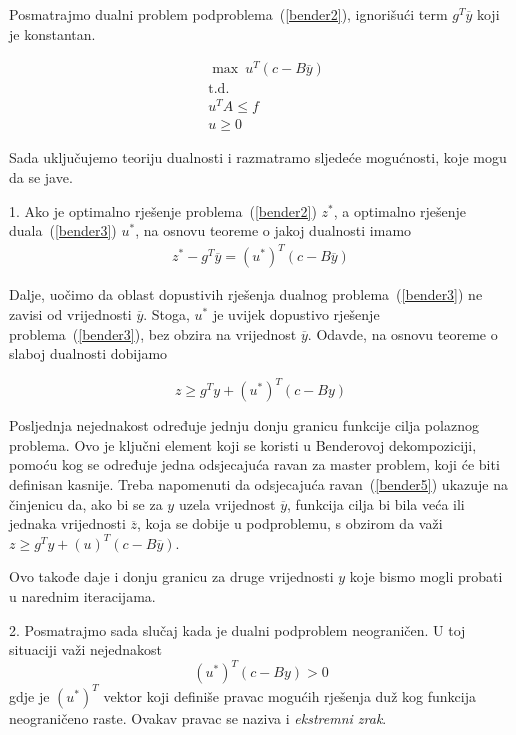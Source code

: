 \documentclass[a4paper, utf8, 11pt, colorlinks]{book}
\theoremstyle{definition}
\begin{document}
 
Posmatrajmo dualni problem podproblema~(\ref{bender2}), ignorišući term $g^T\overline{y}$ koji je konstantan.

\begin{equation}
	\begin{aligned}\label{bender3}
	&\max\ u^T (c-B\overline{y})\\
 		& \mbox{t.d.}\\
	&u^TA\leqslant f\\
	&u\geqslant 0
 \end{aligned}
\end{equation}


Sada uključujemo teoriju dualnosti i razmatramo sljedeće mogućnosti, koje mogu da se jave.
 
1. Ako je optimalno rješenje problema~(\ref{bender2}) $z^*$, a optimalno rješenje duala~(\ref{bender3}) $u^*$, na osnovu teoreme o jakoj  dualnosti imamo
  \begin{equation}
	\begin{aligned}\label{bender4}
z^*-g^T\overline{y}=(u^*)^T(c-B\overline{y})
	\end{aligned}
\end{equation}


Dalje, uočimo da oblast dopustivih rješenja dualnog problema~(\ref{bender3}) ne zavisi od vrijednosti $\overline{y}$. Stoga, $u^*$ je uvijek dopustivo rješenje problema~(\ref{bender3}), bez obzira na vrijednost $\overline{y}$. Odavde, na osnovu teoreme o slaboj  dualnosti dobijamo

  \begin{equation}
\label{bender5}
		z\geqslant g^Ty+(u^*)^T(c-By)
\end{equation}


Posljednja nejednakost određuje jednju donju granicu funkcije cilja polaznog problema. Ovo je ključni element koji se koristi u Benderovoj dekompoziciji, pomoću kog se određuje jedna odsjecajuća ravan za master problem, koji će biti definisan kasnije. Treba napomenuti da odsjecajuća ravan~(\ref{bender5}) ukazuje na činjenicu da, ako bi se za $y$ uzela vrijednost $\overline{y}$, funkcija cilja bi bila veća ili jednaka vrijednosti $\overline{z}$, koja se dobije u podproblemu, s obzirom da važi $	z\geqslant g^Ty+(u)^T(c-B\overline{y})$.

Ovo takođe daje i donju granicu za druge vrijednosti $y$ koje bismo mogli probati u narednim iteracijama.

2. Posmatrajmo sada slučaj kada je dualni podproblem neograničen. U toj situaciji važi nejednakost
\begin{equation}
	\label{bender6}
	(u^*)^T(c-By)>0
\end{equation}
gdje je ${(u^*)}^T$ vektor koji definiše pravac mogućih rješenja duž kog funkcija neograničeno raste. Ovakav pravac se naziva i \emph{ekstremni zrak}.
 
\end{document}
